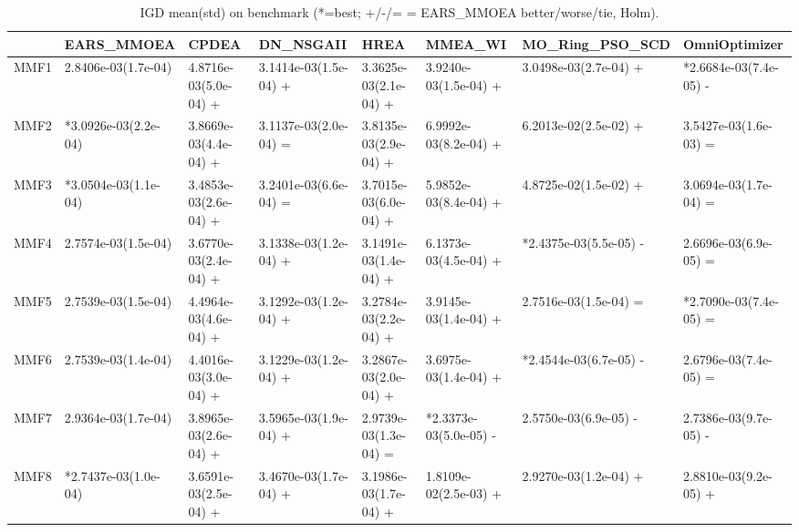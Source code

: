 \begin{table}[t]
\centering
\caption{IGD mean(std) on benchmark (*=best; +/-/= = EARS_MMOEA better/worse/tie, Holm).}
\label{tab:benchmark_IGD}
\begin{tabular}{llllllll}
\toprule
 & EARS\_MMOEA & CPDEA & DN\_NSGAII & HREA & MMEA\_WI & MO\_Ring\_PSO\_SCD & OmniOptimizer \\
\midrule
MMF1 & 2.8406e-03(1.7e-04) & 4.8716e-03(5.0e-04) + & 3.1414e-03(1.5e-04) + & 3.3625e-03(2.1e-04) + & 3.9240e-03(1.5e-04) + & 3.0498e-03(2.7e-04) + & *2.6684e-03(7.4e-05) - \\
MMF2 & *3.0926e-03(2.2e-04) & 3.8669e-03(4.4e-04) + & 3.1137e-03(2.0e-04) = & 3.8135e-03(2.9e-04) + & 6.9992e-03(8.2e-04) + & 6.2013e-02(2.5e-02) + & 3.5427e-03(1.6e-03) = \\
MMF3 & *3.0504e-03(1.1e-04) & 3.4853e-03(2.6e-04) + & 3.2401e-03(6.6e-04) = & 3.7015e-03(6.0e-04) + & 5.9852e-03(8.4e-04) + & 4.8725e-02(1.5e-02) + & 3.0694e-03(1.7e-04) = \\
MMF4 & 2.7574e-03(1.5e-04) & 3.6770e-03(2.4e-04) + & 3.1338e-03(1.2e-04) + & 3.1491e-03(1.4e-04) + & 6.1373e-03(4.5e-04) + & *2.4375e-03(5.5e-05) - & 2.6696e-03(6.9e-05) = \\
MMF5 & 2.7539e-03(1.5e-04) & 4.4964e-03(4.6e-04) + & 3.1292e-03(1.2e-04) + & 3.2784e-03(2.2e-04) + & 3.9145e-03(1.4e-04) + & 2.7516e-03(1.5e-04) = & *2.7090e-03(7.4e-05) = \\
MMF6 & 2.7539e-03(1.4e-04) & 4.4016e-03(3.0e-04) + & 3.1229e-03(1.2e-04) + & 3.2867e-03(2.0e-04) + & 3.6975e-03(1.4e-04) + & *2.4544e-03(6.7e-05) - & 2.6796e-03(7.4e-05) = \\
MMF7 & 2.9364e-03(1.7e-04) & 3.8965e-03(2.6e-04) + & 3.5965e-03(1.9e-04) + & 2.9739e-03(1.3e-04) = & *2.3373e-03(5.0e-05) - & 2.5750e-03(6.9e-05) - & 2.7386e-03(9.7e-05) - \\
MMF8 & *2.7437e-03(1.0e-04) & 3.6591e-03(2.5e-04) + & 3.4670e-03(1.7e-04) + & 3.1986e-03(1.7e-04) + & 1.8109e-02(2.5e-03) + & 2.9270e-03(1.2e-04) + & 2.8810e-03(9.2e-05) + \\
\bottomrule
\end{tabular}
\end{table}
